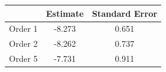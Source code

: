 \begin{tabular}{lcc}
\toprule
 & Estimate & Standard Error \\
\midrule
Order 1 & -8.273 & 0.651 \\
Order 2 & -8.262 & 0.737 \\
Order 5 & -7.731 & 0.911 \\
\bottomrule
\end{tabular}

